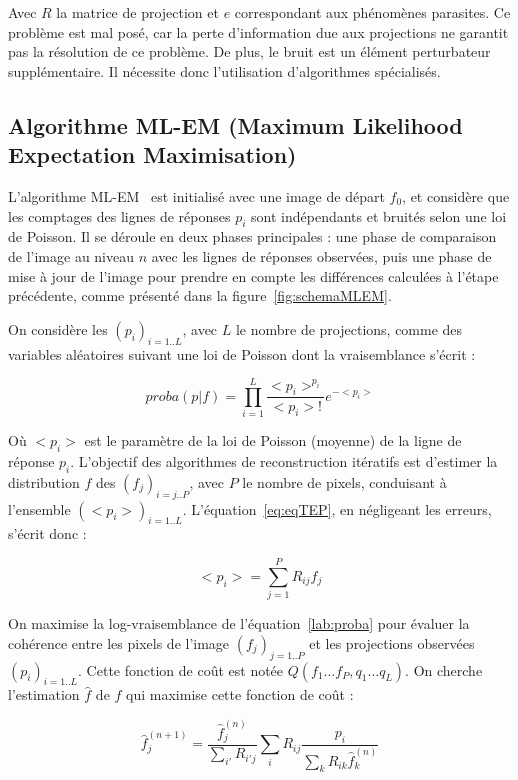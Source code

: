 Avec $R$ la matrice de projection et $e$ correspondant aux phénomènes parasites. Ce problème est mal posé, car la perte d'information due aux projections ne garantit pas la résolution de ce problème. De plus, le bruit est un élément perturbateur supplémentaire. Il nécessite donc l'utilisation d'algorithmes spécialisés. 


		\subsection{Algorithme ML-EM (Maximum Likelihood Expectation Maximisation) }


L'algorithme ML-EM~\cite{shepp1982maximum} est initialisé avec une image de départ $f_0$, et considère que les comptages des lignes de réponses $p_i$ sont indépendants et bruités selon une loi de Poisson. Il se déroule en deux phases principales : une phase de comparaison de l'image au niveau $n$ avec les lignes de réponses observées, puis une phase de mise à jour de l'image pour prendre en compte les différences calculées à l'étape précédente, comme présenté dans la figure~\ref{fig:schemaMLEM}.

On considère les $(p_i)_{i=1..L}$, avec $L$ le nombre de projections, comme des variables aléatoires suivant une loi de Poisson dont la vraisemblance s'écrit :

\begin{equation}
proba(p|f) = \prod\limits_{i=1}^{L} \frac{<p_i>^{p_i}}{<p_i> !} e^{-<p_i>}
\label{lab:proba}
\end{equation}

Où $<p_i>$ est le paramètre de la loi de Poisson (moyenne) de la ligne de réponse $p_i$. L'objectif des algorithmes de reconstruction itératifs est d'estimer la distribution $f$ des $(f_j)_{i=j..P}$, avec $P$ le nombre de pixels, conduisant à l'ensemble $(<p_i>)_{i=1..L}$. L'équation~\ref{eq:eqTEP}, en négligeant les erreurs, s'écrit donc :

\begin{equation}
<p_i> = \sum\limits_{j=1}^{P} R_{ij}f_j
\end{equation}

On maximise la log-vraisemblance de l'équation~\ref{lab:proba} pour évaluer la cohérence entre les pixels de l'image $(f_j)_{j=1..P}$ et les projections observées $(p_i)_{i=1..L}$. Cette fonction de coût est notée $Q(f_1 \dots f_P, q_1 \dots q_L)$. On cherche l'estimation $\hat{f}$ de $f$ qui maximise cette fonction de coût :

\begin{equation}
	\hat{f}_j^{(n+1)}=\frac{\hat{f}_j^{(n)}}{\sum\limits_{i'}R_{i'j}}\sum\limits_{i}R_{ij}\frac{p_i}{\sum\limits_{k}R_{ik}\hat{f}_k^{(n)}}
\label{eq:MLEM}
\end{equation}

